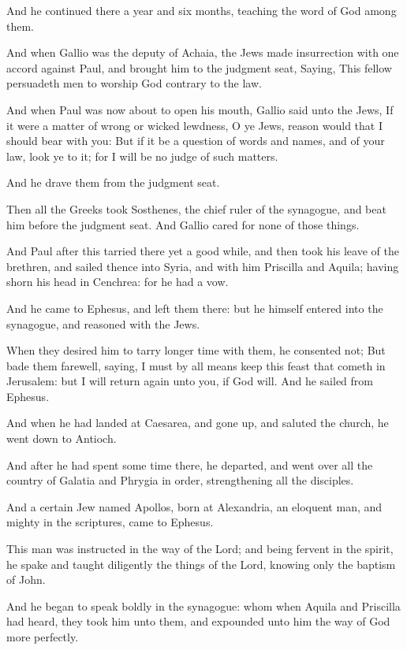 \verse And he continued there a year and six months, teaching the word of God among them.

\verse And when Gallio was the deputy of Achaia, the Jews made insurrection with one accord against Paul, and brought him to the judgment seat, \verse Saying, This fellow persuadeth men to worship God contrary to the law.

\verse And when Paul was now about to open his mouth, Gallio said unto the Jews, If it were a matter of wrong or wicked lewdness, O ye Jews, reason would that I should bear with you: \verse But if it be a question of words and names, and of your law, look ye to it; for I will be no judge of such matters.

\verse And he drave them from the judgment seat.

\verse Then all the Greeks took Sosthenes, the chief ruler of the synagogue, and beat him before the judgment seat. And Gallio cared for none of those things.

\verse And Paul after this tarried there yet a good while, and then took his leave of the brethren, and sailed thence into Syria, and with him Priscilla and Aquila; having shorn his head in Cenchrea: for he had a vow.

\verse And he came to Ephesus, and left them there: but he himself entered into the synagogue, and reasoned with the Jews.

\verse When they desired him to tarry longer time with them, he consented not; \verse But bade them farewell, saying, I must by all means keep this feast that cometh in Jerusalem: but I will return again unto you, if God will. And he sailed from Ephesus.

\verse And when he had landed at Caesarea, and gone up, and saluted the church, he went down to Antioch.

\verse And after he had spent some time there, he departed, and went over all the country of Galatia and Phrygia in order, strengthening all the disciples.

\verse And a certain Jew named Apollos, born at Alexandria, an eloquent man, and mighty in the scriptures, came to Ephesus.

\verse This man was instructed in the way of the Lord; and being fervent in the spirit, he spake and taught diligently the things of the Lord, knowing only the baptism of John.

\verse And he began to speak boldly in the synagogue: whom when Aquila and Priscilla had heard, they took him unto them, and expounded unto him the way of God more perfectly.

